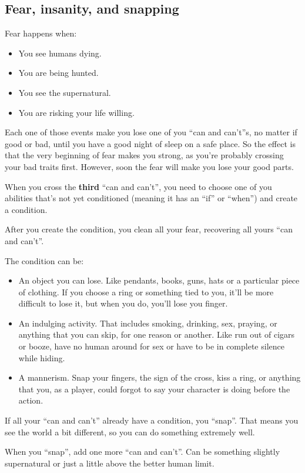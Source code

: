 \documentclass[11pt]{article}
\begin{document}
\subsection{Fear, insanity, and snapping}
\label{sec:org6f20fb4}
Fear happens when:
\begin{itemize}
\item You see humans dying.
\item You are being hunted.
\item You see the supernatural.
\item You are risking your life willing.
\end{itemize}

Each one of those events make you lose one of you \enquote{can and can't}s, no matter if good or bad, until you have a good night of sleep on a safe place. So the effect is that the very beginning of fear makes you strong, as you're probably crossing your bad traits first. However, soon the fear will make you lose your good parts.

When you cross the \textbf{third} \enquote{can and can't}, you need to choose one of you abilities that's not yet conditioned (meaning it has an \enquote{if} or \enquote{when}) and create a condition.

After you create the condition, you clean all your fear, recovering all yours \enquote{can and can't}.

The condition can be:
\begin{itemize}
\item An object you can lose. Like pendants, books, guns, hats or a particular piece of clothing. If you choose a ring or something tied to you, it'll be more difficult to lose it, but when you do, you'll lose you finger.
\item An indulging activity. That includes smoking, drinking, sex, praying, or anything that you can skip, for one reason or another. Like run out of cigars or booze, have no human around for sex or have to be in complete silence while hiding.
\item A mannerism. Snap your fingers, the sign of the cross, kiss a ring, or anything that you, as a player, could forgot to say your character is doing before the action.
\end{itemize}

If all your \enquote{can and can't} already have a condition, you \enquote{snap}. That means you see the world a bit different, so you can do something extremely well.

When you \enquote{snap}, add one more \enquote{can and can't}. Can be something slightly supernatural or just a little above the better human limit.
\end{document}
